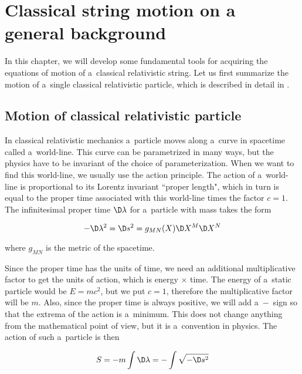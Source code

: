 \chapter{Classical string motion on a general background}
\label{chap:general_background}

In this chapter, we will develop some fundamental tools for acquiring the equations of motion of a~classical relativistic string. Let us first summarize the motion of a~single classical relativistic particle, which is described in detail in \cite{zwiebach}.


\section{Motion of classical relativistic particle}

In classical relativistic mechanics a~particle moves along a~curve in spacetime called a~world-line. This curve can be parametrized in many ways, but the physics have to be invariant of the choice of parameterization. When we want to find this world-line, we usually use the action principle. The action of a~world-line is proportional to its Lorentz invariant ``proper length", which in turn is equal to the proper time associated with this world-line times the factor $c = 1$. The infinitesimal proper time $\D \lambda$ for a~particle with mass takes the form

\begin{equation}
    -\D \lambda^2 = \D s^2 = g_{M N}(X) \D X^{M} \D X^{N} 
\end{equation}

\noindent
where $g_{MN}$ is the metric of the spacetime.

Since the proper time has the units of time, we need an additional multiplicative factor to get the units of action, which is energy $\times$ time. The energy of a~static particle would be $E = m c^2$, but we put $c = 1$, therefore the multiplicative factor will be $m$. Also, since the proper time is always positive, we will add a~$ - $~sign so that the extrema of the action is a~minimum. This does not change anything from the mathematical point of view, but it is a~convention in physics. The action of such a~particle is then

\begin{equation}
    S = -m \int \D \lambda = - \int {\sqrt{-\D s^2}}
\end{equation}

